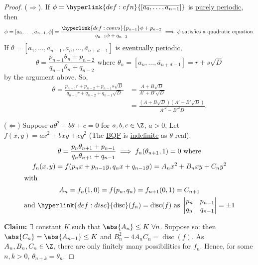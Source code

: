 \documentclass{article}
\DeclareMathOperator{\disc}{disc}
\begin{document}
\begin{proof}
    ($\Rightarrow$). If $\phi = \hyperlink{def:cfn}{[\overline{a_0, \dotsc, a_{n-1}}]}$ is \hyperlink{def:period}{purely periodic}, then
    \begin{equation*}
        \phi = [a_0, \dotsc, a_{n-1}, \phi] = \frac{\hyperlink{def:convs}{p_{n-1}} \phi + p_{n-2}}{q_{n-1} \phi + q_{n-2}} \implies \phi \text{ satisfies a quadratic equation}.
    \end{equation*}
    If $\theta = [a_1, \dotsc, a_{n-1}, \overline{a_n, \dotsc, a_{n+d-1}}]$ is \hyperlink{def:period}{eventually periodic},
    \begin{equation*}
        \theta = \frac{p_{n-1} \theta_n + p_{n-2}}{q_{n-1} \theta_n + q_{n-2}} \text{ where } \theta_n = [\overline{a_n, \dotsc, a_{n+d-1}}] = r + s \sqrt{D}
    \end{equation*}
    by the argument above.
    So,
    \begin{align*}
        \theta = \frac{p_{n-1} r + p_{n-2} + p_{n-1} s \sqrt{D}}{q_{n-1} r + q_{n-2} + q_{n-1} \sqrt{D}} &= \frac{A + B \sqrt{D}}{A' + B' \sqrt{D}} \\
                                                                                                         &= \frac{(A + B \sqrt{D})(A' - B' \sqrt{D})}{A'^2 - B'^2 D}.
    \end{align*}

    ($\Leftarrow$) Suppose $a \theta^2 + b \theta + c= 0$ for $a, b, c \in \Z$, $a > 0$.
    Let $f(x, y) = a x^2 + b x y + c y^2$ (The \hyperlink{def:bqf}{BQF} is \hyperlink{def:definite}{indefinite} as $\theta$ real).
    \begin{gather*}
        \theta = \frac{p_n \theta_{n+1} + p_{n-1}}{q_n \theta_{n+1} + q_{n-1}} \implies f_n(\theta_{n+1}, 1) = 0 \text{ where} \\
        f_n(x, y) = f(p_n x + p_{n-1} y, q_n x + q_{n-1} y) = A_n x^2 + B_n x y + C_n y^2 \\
        \shortintertext{with}
        A_n = f_n(1, 0) = f(p_n, q_n) = f_{n+1}(0, 1) = C_{n+1} \\
        \text{and } \hyperlink{def:disc}{\disc}(f_n) = \disc(f) \text{ as } \begin{vmatrix} p_n & p_{n-1} \\ q_n & q_{n-1} \end{vmatrix} = \pm 1
    \end{gather*}

    \textbf{Claim:} $\exists$ constant $K$ such that $\abs{A_n} \leq K \ \forall n$.
    Suppose so: then $\abs{C_n} = \abs{A_{n-1}} \leq K$ and $B_n^2 - 4 A_n C_n = \disc(f)$.
    As $A_n, B_n, C_n \in \Z$, there are only finitely many possibilities for $f_n$. Hence, for some $n, k > 0$, $\theta_{n+k} = \theta_n$.


\end{proof}
\end{document}
